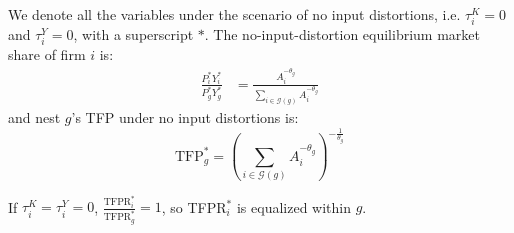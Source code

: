 \documentclass[12pt]{article}
\begin{document}
We denote all the variables under the scenario of no input distortions, i.e. $\tau_i^K=0$ and $\tau_i^Y=0$, with a superscript $*$. The no-input-distortion equilibrium market share of firm $i$ is:
\begin{align*}
\frac{P_i^*Y_i^*}{P_g^*Y_g^*} &= \frac{ A_i ^{-\theta_g}}{\sum_{i \in \mathcal{G}(g)} A_i ^{-\theta_g}}
\end{align*}
and nest $g$'s TFP under no input distortions is:
$$\text{TFP}_g^*= \left(\sum_{i \in \mathcal{G}(g)} A_i^{-\theta_g} \right)^{-\frac{1}{\theta_g}}$$

If $\tau_i^K=\tau_i^Y=0$, $\frac{\text{TFPR}_i^*}{\text{TFPR}_g^*}=1$, so TFPR$_i^*$ is equalized within $g$. %
\end{document}
